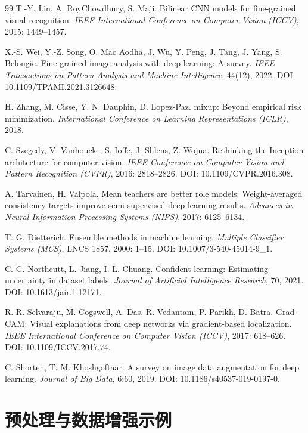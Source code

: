 \documentclass[11pt,a4paper,UTF8,fontset=windows]{ctexart}
\begin{document}
\begin{thebibliography}{99}
T.-Y. Lin, A. RoyChowdhury, S. Maji.
Bilinear CNN models for fine-grained visual recognition.
\textit{IEEE International Conference on Computer Vision (ICCV)}, 2015: 1449--1457.

X.-S. Wei, Y.-Z. Song, O. Mac Aodha, J. Wu, Y. Peng, J. Tang, J. Yang, S. Belongie.
Fine-grained image analysis with deep learning: A survey.
\textit{IEEE Transactions on Pattern Analysis and Machine Intelligence}, 44(12), 2022.
DOI: 10.1109/TPAMI.2021.3126648.

H. Zhang, M. Cisse, Y. N. Dauphin, D. Lopez-Paz.
mixup: Beyond empirical risk minimization.
\textit{International Conference on Learning Representations (ICLR)}, 2018.

C. Szegedy, V. Vanhoucke, S. Ioffe, J. Shlens, Z. Wojna.
Rethinking the Inception architecture for computer vision.
\textit{IEEE Conference on Computer Vision and Pattern Recognition (CVPR)}, 2016: 2818--2826.
DOI: 10.1109/CVPR.2016.308.

A. Tarvainen, H. Valpola.
Mean teachers are better role models: Weight-averaged consistency targets improve semi-supervised deep learning results.
\textit{Advances in Neural Information Processing Systems (NIPS)}, 2017: 6125--6134.

T. G. Dietterich.
Ensemble methods in machine learning.
\textit{Multiple Classifier Systems (MCS)}, LNCS 1857, 2000: 1--15.
DOI: 10.1007/3-540-45014-9\_1.

C. G. Northcutt, L. Jiang, I. L. Chuang.
Confident learning: Estimating uncertainty in dataset labels.
\textit{Journal of Artificial Intelligence Research}, 70, 2021.
DOI: 10.1613/jair.1.12171.

R. R. Selvaraju, M. Cogswell, A. Das, R. Vedantam, P. Parikh, D. Batra.
Grad-CAM: Visual explanations from deep networks via gradient-based localization.
\textit{IEEE International Conference on Computer Vision (ICCV)}, 2017: 618--626.
DOI: 10.1109/ICCV.2017.74.

C. Shorten, T. M. Khoshgoftaar.
A survey on image data augmentation for deep learning.
\textit{Journal of Big Data}, 6:60, 2019.
DOI: 10.1186/s40537-019-0197-0.
\end{thebibliography}

\appendix

\section{预处理与数据增强示例}
\label{app:preprocess}
\end{document}
